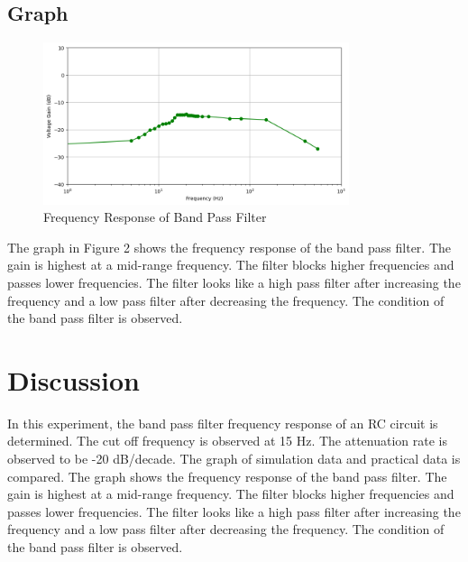 \documentclass[12pt]{article}
\begin{document}
\newpage
\subsection{Graph}

\begin{figure}[h]
    \centering
    \includegraphics[width=0.8\textwidth]{BPF_Graph.png}
    \caption{Frequency Response of Band Pass Filter}
\end{figure}

The graph in Figure 2 shows the frequency response of the band pass filter. The gain is highest at a mid-range frequency. The filter blocks higher frequencies and passes lower frequencies. The filter looks like a high pass filter after increasing the frequency and a low pass filter after decreasing the frequency. The condition of the band pass filter is observed.

\section{Discussion}

In this experiment, the band pass filter frequency response of an RC circuit is determined. The cut off frequency is observed at 15 Hz. The attenuation rate is observed to be -20 dB/decade. The graph of simulation data and practical data is compared. The graph shows the frequency response of the band pass filter. The gain is highest at a mid-range frequency. The filter blocks higher frequencies and passes lower frequencies. The filter looks like a high pass filter after increasing the frequency and a low pass filter after decreasing the frequency. The condition of the band pass filter is observed.
\end{document}
